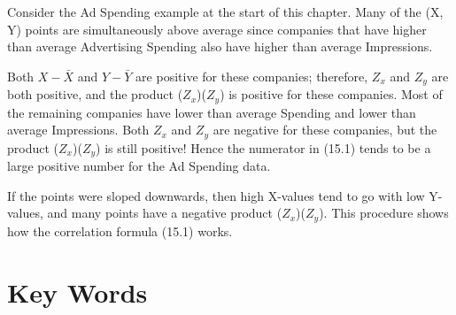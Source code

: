 \documentclass[11pt, chapterprefix=true]{scrbook}\usepackage[]{graphicx}\usepackage[]{color}
\begin{document}
Consider the Ad Spending example at the start of this chapter.  Many of the (X, Y) points are simultaneously above average since companies that have higher than average Advertising Spending also have higher than average Impressions.  

Both $X - \bar{X}$  and $Y - \bar{Y}$ are positive for these companies; therefore, $Z_x$  and $Z_y$  are both positive, and the product ($Z_x$)($Z_y$)  is positive for these companies.  Most of the remaining companies have lower than average Spending and lower than average Impressions.  Both $Z_x$  and $Z_y$  are negative for these companies, but the product ($Z_x$)($Z_y$) is still positive!  Hence the numerator in (15.1) tends to be a large positive number for the Ad Spending data.

If the points were sloped downwards, then high X-values tend to go with low Y-values, and many points have a negative product ($Z_x$)($Z_y$).  This procedure shows how the correlation formula (15.1) works.  



\section{Key Words}

\end{document}
